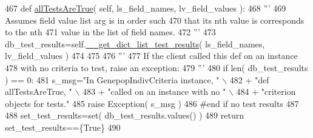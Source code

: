 \begin{DoxyCode}
467     \textcolor{keyword}{def }\hyperlink{classnegui_1_1genepopindividualid_1_1GenepopIndivCriteria_a8b5b08b5100a7aaa759c26489b87eb34}{allTestsAreTrue}( self, ls\_field\_names, lv\_field\_values ):
468         \textcolor{stringliteral}{'''}
469 \textcolor{stringliteral}{        Assumes field value list arg is in order such}
470 \textcolor{stringliteral}{        that its nth value is corresponds to the nth}
471 \textcolor{stringliteral}{        value in the list of field names.}
472 \textcolor{stringliteral}{        '''}
473         db\_test\_results=self.\hyperlink{classnegui_1_1genepopindividualid_1_1GenepopIndivCriteria_a1bce8a4201a0935fe6d6ff03f06071ed}{\_\_get\_dict\_list\_test\_results}( ls\_field\_names, 
      lv\_field\_values )
474 
475 
476         \textcolor{stringliteral}{'''}
477 \textcolor{stringliteral}{        If the client called this def on an instance}
478 \textcolor{stringliteral}{        with no criteria to test, raise an exception:}
479 \textcolor{stringliteral}{        '''}
480         \textcolor{keywordflow}{if} len( db\_test\_results ) == 0:
481             s\_msg=\textcolor{stringliteral}{"In GenepopIndivCriteria instance, "} \(\backslash\)
482                     + \textcolor{stringliteral}{"def allTestsAreTrue, "} \(\backslash\)
483                     + \textcolor{stringliteral}{"called on an instance with no "} \(\backslash\)
484                     + \textcolor{stringliteral}{"criterion objects for tests."}
485             \textcolor{keywordflow}{raise} Exception( s\_msg )
486         \textcolor{comment}{#end if no test results}
487 
488         set\_test\_results=set( db\_test\_results.values() )
489         \textcolor{keywordflow}{return} set\_test\_results==\{\textcolor{keyword}{True}\}
490 
\end{DoxyCode}
